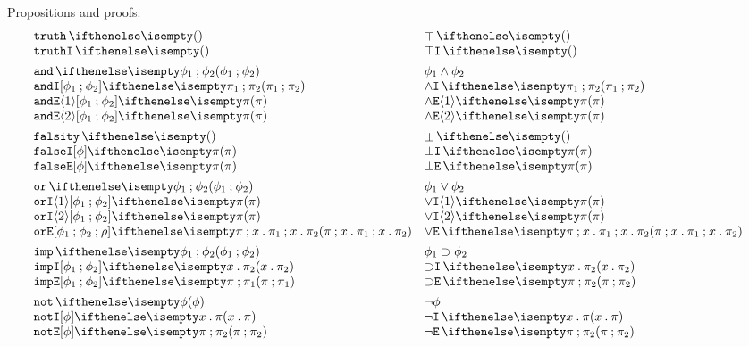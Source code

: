 \documentclass[11pt,twoside]{article}
\begin{document}
\noindent Propositions and proofs:
\begin{displaymath}
  \begin{array}{l@{\quad}l@{\quad}l}
    \trueProp & \trueProp* \\    
    \trueIPf & \trueIPf* \\[1ex]

    \andProp{\phi_1}{\phi_2} & \andProp*{\phi_1}{\phi_2} \\
    \andIPf{\pi_1}{\pi_2} & \andIPf*{\pi_1}{\pi_2} \\
    \andEPf[\phi_1][\phi_2]<1>{\pi} & \andEPf*<1>{\pi} \\
    \andEPf[\phi_1][\phi_2]<2>{\pi} & \andEPf*<2>{\pi} \\[1ex]

    \falseProp & \falseProp* \\
    \falseIPf[\phi]{\pi} & \falseIPf*{\pi} \\
    \falseEPf[\phi]{\pi} & \falseEPf*{\pi} \\[1ex]
    
    \orProp{\phi_1}{\phi_2}  & \orProp*{\phi_1}{\phi_2} \\
    \orIPf[\phi_1][\phi_2]<1>{\pi} & \orIPf*<1>{\pi} \\
    \orIPf[\phi_1][\phi_2]<2>{\pi} & \orIPf*<2>{\pi} \\
    \orEPf[\phi_1][\phi_2]{\pi}{x}{\pi_1}{x}{\pi_2} & \orEPf*{\pi}{x}{\pi_1}{x}{\pi_2} \\[1ex]

    \impProp{\phi_1}{\phi_2} & \impProp*{\phi_1}{\phi_2} \\
    \impIPf[\phi_1][\phi_2]{x}{\pi_2} & \impIPf*{x}{\pi_2} \\
    \impEPf[\phi_1][\phi_2]{\pi}{\pi_1} & \impEPf*{\pi}{\pi_2} \\[1ex]

    \notProp{\phi} & \notProp*{\phi} \\
    \notIPf[\phi]{x}{\pi} & \notIPf*{x}{\pi} \\
    \notEPf[\phi]{\pi}{\pi_2} & \notEPf*{\pi}{\pi_2}

  \end{array}
\end{displaymath}
\end{document}
